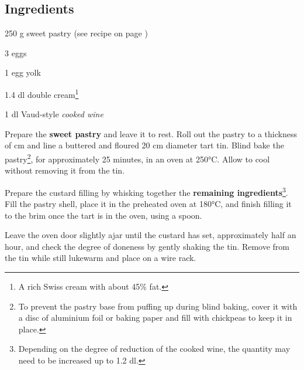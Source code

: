 \newpage
{}

\subsection*{Ingredients}
\begin{ingredients}
	\item 250 g sweet pastry (see recipe on page \pageref{bundner_nusstorte})
	\item 3 eggs
	\item 1 egg yolk
	\item 1.4 dl double cream\footnote{A rich Swiss cream with about 45\% fat.}
	\item 1 dl Vaud-style \textit{cooked wine}
\end{ingredients}

\medskip

Prepare the \textbf{sweet pastry} and leave it to rest.  
Roll out the pastry to a thickness of  cm and line a buttered and floured 20 cm diameter tart tin.  
Blind bake the pastry\footnote{To prevent the pastry base from puffing up during blind baking, cover it with a disc of aluminium foil or baking paper and fill with chickpeas to keep it in place.}, for approximately 25 minutes, in an oven at 250°C.  
Allow to cool without removing it from the tin.  

Prepare the custard filling by whisking together the \textbf{remaining ingredients}\footnote{Depending on the degree of reduction of the cooked wine, the quantity may need to be increased up to 1.2 dl.}.  
Fill the pastry shell, place it in the preheated oven at 180°C, and finish filling it to the brim once the tart is in the oven, using a spoon.

Leave the oven door slightly ajar until the custard has set, approximately half an hour, and check the degree of doneness by gently shaking the tin.  
Remove from the tin while still lukewarm and place on a wire rack.

\vspace*{0.75 cm}

\begin{recipeblock}
	\noindent 
\end{recipeblock}